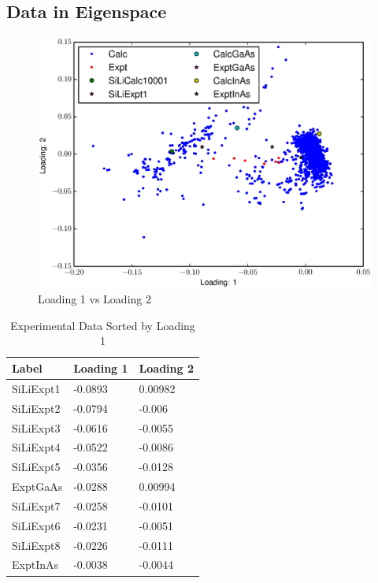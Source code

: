 \documentclass[12pt,letterpaper]{article}
\begin{document}
\subsection{Data in Eigenspace}
\begin{figure}[ht]
  \begin{center}
    \includegraphics[scale=0.8]{figs/eigenspace1-2.eps}
    \caption{Loading 1 vs  Loading 2}
  \end{center}
\end{figure}

\begin{table}[ht]
  \begin{center}
  \begin{tabular}{|l|l|l|}
    \hline
    \textbf{Label} & \textbf{Loading 1} & \textbf{Loading 2} \\ \hline
    SiLiExpt1      & -0.0893            & 0.00982            \\ \hline
    SiLiExpt2      & -0.0794            & -0.006             \\ \hline
    SiLiExpt3      & -0.0616            & -0.0055            \\ \hline
    SiLiExpt4      & -0.0522            & -0.0086            \\ \hline
    SiLiExpt5      & -0.0356            & -0.0128            \\ \hline
    ExptGaAs       & -0.0288            & 0.00994            \\ \hline
    SiLiExpt7      & -0.0258            & -0.0101            \\ \hline
    SiLiExpt6      & -0.0231            & -0.0051            \\ \hline
    SiLiExpt8      & -0.0226            & -0.0111            \\ \hline
    ExptInAs       & -0.0038            & -0.0044            \\ \hline
  \end{tabular}
  \caption{Experimental Data Sorted by Loading 1}
  \end{center}
\end{table}
\end{document}
